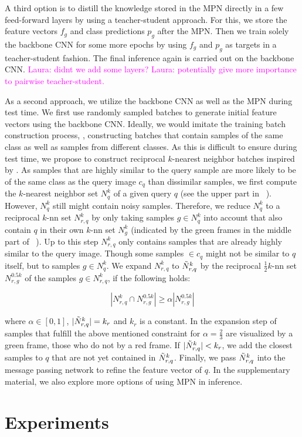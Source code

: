 \documentclass{article}
\newcommand{\lau}[1]{\textcolor{magenta}{Laura: #1}}
\begin{document}
 A third option is to distill the knowledge stored in the MPN directly in a few feed-forward layers by using a teacher-student approach. 
For this, we store the feature vectors $f_g$ and class predictions $p_g$ after the MPN. Then we train solely the backbone CNN for some more epochs by using $f_g$ and $p_g$ as targets in a teacher-student fashion. The final inference again is carried out on the backbone CNN.  \lau{didnt we add some layers?}
\lau{potentially give more importance to pairwise teacher-student.}
\fi

As a second approach, we utilize the backbone CNN as well as the MPN during test time. We first use randomly sampled batches to generate initial feature vectors using the backbone CNN. Ideally, we would imitate the training batch construction process, \ie, constructing batches that contain samples of the same class as well as samples from different classes. As this is difficult to ensure during test time, we propose to construct reciprocal $k$-nearest neighbor batches inspired by \cite{DBLP:conf/cvpr/ZhongZCL17}. As samples that are highly similar to the query sample are more likely to be of the same class as the query image $c_q$ than dissimilar samples, we first compute the $k$-nearest neighbor set $N_q^k$ of a given query $q$ (see the upper part in ~). However, $N_q^k$ still might contain noisy samples. Therefore, we reduce $N_q^k$ to a reciprocal $k$-nn set $N_{r, q}^k$ by only taking samples $g \in N_q^k$ into account that also contain $q$ in their own $k$-nn set $N_g^k$ (indicated by the green frames in the middle part of ~). Up to this step $N_{r, q}^k$ only contains samples that are already highly similar to the query image. Though some samples $\in c_q$ might not be similar to $q$ itself, but to samples $g \in N_q^k$. We expand $N_{r, q}^k$ to $\Tilde{N}_{r, q}^k$ by the reciprocal $\frac{1}{2}k$-nn set $N_{r, g}^{0.5 k}$ of the samples $g \in N_{r, q}^k$, if the following holds:

\begin{equation}
    |N_{r, q}^k \cap N_{r, g}^{0.5 k}| \geq \alpha |N_{r, g}^{0.5 k}|
\end{equation}

where $\alpha \in [0, 1]$, $|\Tilde{N}_{r, q}^k| = k_r$ and $k_r$ is a constant. In the expansion step of ~ samples that fulfill the above mentioned constraint for $\alpha = \frac{2}{3}$ are visualized by a green frame, those who do not by a red frame. If $|\Tilde{N}_{r, q}^k| < k_r$, we add the closest samples to $q$ that are not yet contained in $\Tilde{N}_{r, q}^k$. Finally, we pass $\Tilde{N}_{r, q}^k$ into the message passing network to refine the feature vector of $q$. In the supplementary material, we also explore more options of using MPN in inference.
\fi \section{Experiments}
\end{document}
